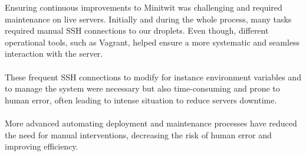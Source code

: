 Ensuring continuous improvements to Minitwit was challenging and required maintenance on live servers. Initially and during the whole process, many tasks required manual SSH connections to our droplets. Even though, different operational tools, such as Vagrant, helped ensure a more systematic and seamless interaction with the server. 
\\
\\
These frequent SSH connections to modify for instance environment variables and to manage the system were necessary but also time-consuming and prone to human error, often leading to intense situation to reduce servers downtime.
\\
\\
More advanced automating deployment and maintenance processes have reduced the need for manual interventions, decreasing the risk of human error and improving efficiency.


